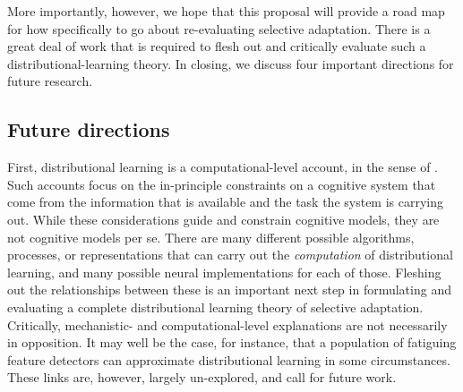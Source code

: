 More importantly, however, we hope that this proposal will provide a road map for how specifically to go about re-evaluating selective adaptation.  There is a great deal of work that is required to flesh out and critically evaluate such a distributional-learning theory.  In closing, we discuss four important directions for future research.

\subsection{Future directions}
\label{sec:future-directions-1}

First, distributional learning is a computational-level account, in the sense of \textcite{Marr1982}.  Such accounts focus on the in-principle constraints on a cognitive system that come from the information that is available and the task the system is carrying out.  While these considerations guide and constrain cognitive models, they are not cognitive models per se.  There are many different possible algorithms, processes, or representations that can carry out the \emph{computation} of distributional learning, and many possible neural implementations for each of those.  Fleshing out the relationships between these is an important next step in formulating and evaluating a complete distributional learning theory of selective adaptation.  Critically, mechanistic- and computational-level explanations are not necessarily in opposition.  It may well be the case, for instance, that a population of fatiguing feature detectors can approximate distributional learning in some circumstances.  These links are, however, largely un-explored, and call for future work.

